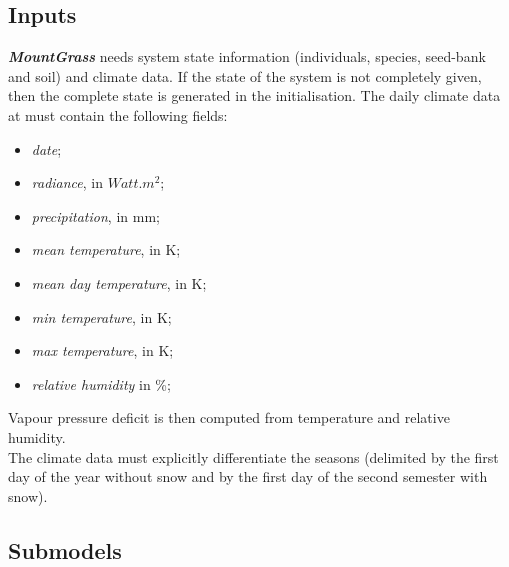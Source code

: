 \documentclass[a4paper,twoside, justified,marginals=raggedright, nobib]{tufte-handout}
\newcommand{\model}{\textit{\textbf{MountGrass }}}
\begin{document}
\subsection{Inputs}
\model needs system state information (individuals, species, seed-bank and soil) and climate data. If the state of the system is not completely given, then the complete state is generated in the initialisation. The daily climate data at must contain the following fields:
\begin{itemize}
\setlength\itemsep{0em}
\item \textit{date};
\item \textit{radiance}, in $Watt.m^{2}$;
\item \textit{precipitation}, in mm;
\item \textit{mean temperature}, in K;
\item \textit{mean day temperature}, in K;
\item \textit{min temperature}, in K;
\item \textit{max temperature}, in K;
\item \textit{relative humidity} in \%;
\end{itemize}
Vapour pressure deficit is then computed from temperature and relative humidity.\\
\indent The climate data must explicitly differentiate the seasons (delimited by the first day of the year without snow and by the first day of the second semester with snow).

\subsection{Submodels}
\end{document}

